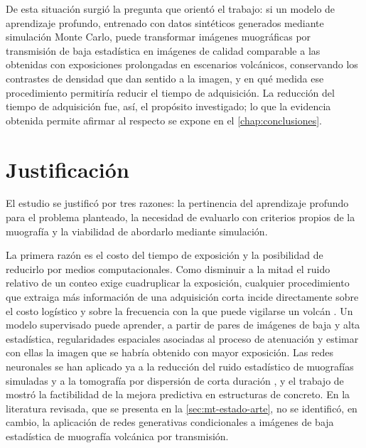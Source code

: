 De esta situación surgió la pregunta que orientó el trabajo: si un modelo de aprendizaje profundo, entrenado con datos sintéticos generados mediante simulación Monte Carlo, puede transformar imágenes muográficas por transmisión de baja estadística en imágenes de calidad comparable a las obtenidas con exposiciones prolongadas en escenarios volcánicos, conservando los contrastes de densidad que dan sentido a la imagen, y en qué medida ese procedimiento permitiría reducir el tiempo de adquisición. La reducción del tiempo de adquisición fue, así, el propósito investigado; lo que la evidencia obtenida permite afirmar al respecto se expone en el \cref{chap:conclusiones}.

\section{Justificación}
\label{sec:intro-justificacion}

El estudio se justificó por tres razones: la pertinencia del aprendizaje profundo para el problema planteado, la necesidad de evaluarlo con criterios propios de la muografía y la viabilidad de abordarlo mediante simulación.

La primera razón es el costo del tiempo de exposición y la posibilidad de reducirlo por medios computacionales. Como disminuir a la mitad el ruido relativo de un conteo exige cuadruplicar la exposición, cualquier procedimiento que extraiga más información de una adquisición corta incide directamente sobre el costo logístico y sobre la frecuencia con la que puede vigilarse un volcán \parencite{tanaka2023muography,lechmann2021}. Un modelo supervisado puede aprender, a partir de pares de imágenes de baja y alta estadística, regularidades espaciales asociadas al proceso de atenuación y estimar con ellas la imagen que se habría obtenido con mayor exposición. Las redes neuronales se han aplicado ya a la reducción del ruido estadístico de muografías simuladas \parencite{lefevre2024} y a la tomografía por dispersión de corta duración \parencite{wang2026}, y el trabajo de \textcite{odonnell2025particles} mostró la factibilidad de la mejora predictiva en estructuras de concreto. En la literatura revisada, que se presenta en la \cref{sec:mt-estado-arte}, no se identificó, en cambio, la aplicación de redes generativas condicionales a imágenes de baja estadística de muografía volcánica por transmisión.

